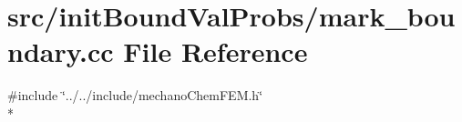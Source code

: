 \section{src/init\-Bound\-Val\-Probs/mark\-\_\-boundary.cc File Reference}
\label{mark__boundary_8cc}
{\ttfamily \#include \char`\"{}../../include/mechano\-Chem\-F\-E\-M.\-h\char`\"{}}\\*

